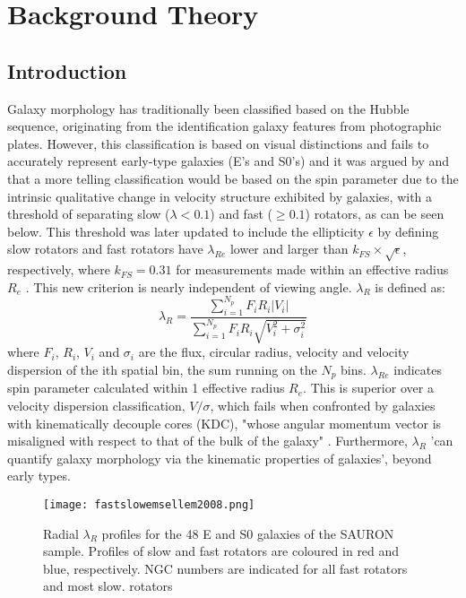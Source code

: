 
\chapter{Background Theory}

\label{ch:background}

\section{Introduction}
Galaxy morphology has traditionally been classified based on the Hubble sequence, originating from the identification galaxy features from photographic plates. However, this classification is based on visual distinctions and fails to accurately represent early-type galaxies (E's and S0's) and it was argued by \cite{Cappellari2011} and \cite{Emsellem2011} that a more telling classification would be based on the spin parameter due to the intrinsic qualitative change in velocity structure exhibited by galaxies, with a threshold of separating slow ($\lambda<0.1$) and fast ($\geq0.1$) rotators, as can be seen below. This threshold was later updated to include the ellipticity $\epsilon$ by defining slow rotators and fast rotators have $\lambda_{Re}$ lower and larger than $k_{FS} \times \sqrt{\epsilon}$, respectively, where $k_{FS} = 0.31$ for measurements made within an effective radius $R_{e}$ \cite{Emsellem2011}. This new criterion is nearly independent of viewing angle.
$\lambda_{R}$ is defined as\cite{sauron9}:
\begin{equation}
\lambda_{R} = \frac{\sum_{i=1}^{N_{p}} F_{i}R_{i}|V_{i}|}{\sum_{i=1}^{N_{p}}F_{i}R_{i}\sqrt{V_{i}^2+\sigma_{i}^2}}
\end{equation}
where $F_i$, $R_i$, $V_i$ and $σ_i$ are the flux, circular radius, velocity and velocity dispersion of the ith spatial bin, the sum running on the $N_p$ bins. $\lambda_{Re}$ indicates spin parameter calculated within 1 effective radius $R_{e}$.
This is superior over a velocity dispersion classification, $V/\sigma$, which fails when confronted by galaxies with kinematically decouple cores (KDC), "whose angular momentum vector is misaligned with respect to that of the bulk of the galaxy" \cite{mo_bosch_white_2010}. Furthermore, $\lambda_{R}$ 'can quantify galaxy morphology via the kinematic properties of galaxies\cite{Cortese2016}', beyond early types. 
\begin{figure}[h]
	\centering
	\texttt{[image: fastslowemsellem2008.png]}
	\caption{Radial $\lambda_{R}$ profiles for the 48 E and S0 galaxies of the SAURON
		sample. Profiles of slow and fast rotators are coloured in red and blue, respectively.
		NGC numbers are indicated for all fast rotators and most slow.
		rotators \cite{Emsellem2011}}
	\label{fig:morphsplit}
\end{figure}

